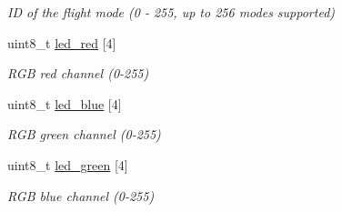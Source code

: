 \begin{DoxyCompactItemize}
\begin{DoxyCompactList}\small\item\em I\+D of the flight mode (0 -\/ 255, up to 256 modes supported) \end{DoxyCompactList}\item 
\hypertarget{struct____mavlink__set__quad__swarm__led__roll__pitch__yaw__thrust__t_ade52bef2ffe756cf1b3e11e38d627332}{uint8\+\_\+t \hyperlink{struct____mavlink__set__quad__swarm__led__roll__pitch__yaw__thrust__t_ade52bef2ffe756cf1b3e11e38d627332}{led\+\_\+red} \mbox{[}4\mbox{]}}\label{struct____mavlink__set__quad__swarm__led__roll__pitch__yaw__thrust__t_ade52bef2ffe756cf1b3e11e38d627332}

\begin{DoxyCompactList}\small\item\em R\+G\+B red channel (0-\/255) \end{DoxyCompactList}\item 
\hypertarget{struct____mavlink__set__quad__swarm__led__roll__pitch__yaw__thrust__t_a19f289bb0c8d5c27658941a407bb6188}{uint8\+\_\+t \hyperlink{struct____mavlink__set__quad__swarm__led__roll__pitch__yaw__thrust__t_a19f289bb0c8d5c27658941a407bb6188}{led\+\_\+blue} \mbox{[}4\mbox{]}}\label{struct____mavlink__set__quad__swarm__led__roll__pitch__yaw__thrust__t_a19f289bb0c8d5c27658941a407bb6188}

\begin{DoxyCompactList}\small\item\em R\+G\+B green channel (0-\/255) \end{DoxyCompactList}\item 
\hypertarget{struct____mavlink__set__quad__swarm__led__roll__pitch__yaw__thrust__t_a9133c4d35eb18f8fd01f232a5ee45c7f}{uint8\+\_\+t \hyperlink{struct____mavlink__set__quad__swarm__led__roll__pitch__yaw__thrust__t_a9133c4d35eb18f8fd01f232a5ee45c7f}{led\+\_\+green} \mbox{[}4\mbox{]}}\label{struct____mavlink__set__quad__swarm__led__roll__pitch__yaw__thrust__t_a9133c4d35eb18f8fd01f232a5ee45c7f}

\begin{DoxyCompactList}\small\item\em R\+G\+B blue channel (0-\/255) \end{DoxyCompactList}\end{DoxyCompactItemize}


